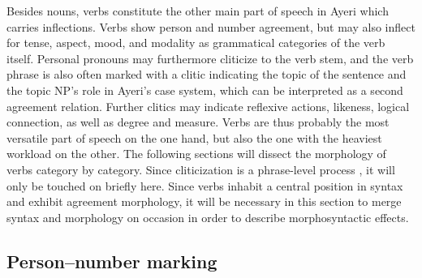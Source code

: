 Besides nouns, verbs constitute the other main part of speech in Ayeri which 
carries inflections. Verbs show person and number agreement, but may also 
inflect for tense, aspect, mood, and modality as grammatical categories of the 
verb itself. Personal pronouns may furthermore cliticize to the verb stem, and 
the verb phrase is also often marked with a clitic indicating the topic of 
the sentence and the topic NP's role in Ayeri's case system, which can be 
interpreted as a second agreement relation. Further clitics may indicate 
reflexive actions, likeness, logical connection, as well as degree and measure. 
Verbs are thus probably the most versatile part of speech on the one hand, but 
also the one with the heaviest workload on the other. The following sections 
will dissect the morphology of verbs category by category. Since cliticization 
is a phrase-level process \citep{klavans1985}, it will only be touched on 
briefly here. Since verbs inhabit a central position in syntax and exhibit 
agreement morphology, it will be necessary in this section to merge syntax and 
morphology on occasion in order to describe morphosyntactic effects.

\subsection{Person--number marking}

